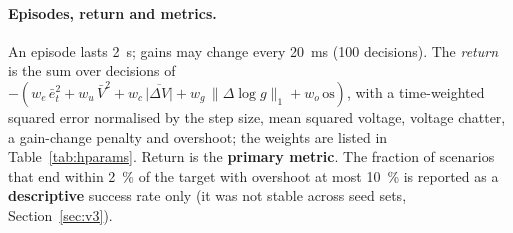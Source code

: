 \paragraph*{Episodes, return and metrics.} An episode lasts \SI{2}{s}; gains may change every \SI{20}{ms} (100 decisions). The \emph{return} is the sum over decisions of $-(w_e\,\bar e^2_t + w_u\,\bar V^2 + w_c\,\overline{|\Delta V|} + w_g\,\|\Delta\log g\|_1 + w_o\,\mathrm{os})$, with a time-weighted squared error normalised by the step size, mean squared voltage, voltage chatter, a gain-change penalty and overshoot; the weights are listed in Table~\ref{tab:hparams}. Return is the \textbf{primary metric}. The fraction of scenarios that end within \SI{2}{\%} of the target with overshoot at most \SI{10}{\%} is reported as a \textbf{descriptive} success rate only (it was not stable across seed sets, Section~\ref{sec:v3}).
